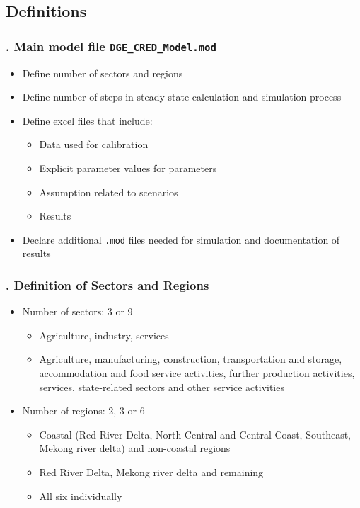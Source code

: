 \documentclass[11pt,aspectratio=169]{beamer}
\begin{document}
\subsection{Definitions}
\begin{frame}
\frametitle{{\thesection.\thesubsection} Main model file  \texttt{DGE\_CRED\_Model.mod}}
\begin{itemize}
\item Define number of sectors and regions 
\item Define number of steps in steady state calculation and simulation process  
\item Define excel files that include:
	\begin{itemize}
		\item Data used for calibration
		\item Explicit parameter values for parameters
		\item Assumption related to scenarios
		\item Results 
	\end{itemize}
\item Declare additional  \texttt{.mod} files needed for simulation and documentation of results   
\end{itemize}
\end{frame}

\begin{frame}
\frametitle{{\thesection.\thesubsection} Definition of Sectors and Regions}
\begin{itemize}
\item Number of sectors: 3 or 9
	\begin{itemize}
		\item Agriculture, industry, services
		\item Agriculture, manufacturing, construction, transportation and storage, accommodation and food service activities, further production activities, services, state-related sectors and other service activities
	\end{itemize}	
\item Number of regions: 2, 3 or 6
	\begin{itemize}
		\item Coastal (Red River Delta, North Central and Central Coast, Southeast, Mekong river delta) and non-coastal regions
		\item Red River Delta, Mekong river delta and remaining
		\item All six individually
	\end{itemize}	
\end{itemize}
\end{frame}
\end{document}
